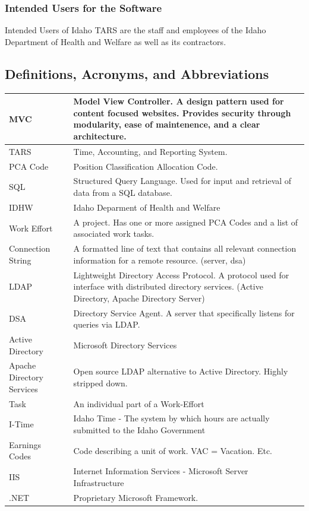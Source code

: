 \documentclass[letterpaper]{article}
\begin{document}
\subsubsection{Intended Users for the Software}
Intended Users of Idaho TARS are the staff and employees of the Idaho Department of Health and Welfare as well as its contractors.

\subsection{\bfseries{Definitions, Acronyms, and Abbreviations}}
\begin{center}
\begin{tabular}{| l | p{10cm} |}
\hline
MVC & Model View Controller. A design pattern used for content focused websites. Provides security through modularity, ease of maintenence, and a clear architecture.\\ \hline
TARS & Time, Accounting, and Reporting System. \\ \hline
PCA Code & Position Classification Allocation Code. \\ \hline
SQL & Structured Query Language. Used for input and retrieval of data from a SQL database.\\ \hline
IDHW & Idaho Deparment of Health and Welfare \\ \hline
Work Effort & A project. Has one or more assigned PCA Codes and a list of associated work tasks.\\ \hline
Connection String & A formatted line of text that contains all relevant connection information for a remote resource. (server, dsa) \\ \hline
LDAP & Lightweight Directory Access Protocol. A protocol used for interface with distributed directory services. (Active Directory, Apache Directory Server) \\ \hline  
DSA & Directory Service Agent. A server that specifically listens for queries via LDAP. \\ \hline
Active Directory & Microsoft Directory Services \\ \hline
Apache Directory Services & Open source LDAP alternative to Active Directory. Highly stripped down. \\ \hline
Task & An individual part of a Work-Effort \\ \hline
I-Time & Idaho Time - The system by which hours are actually submitted to the Idaho Government \\ \hline
Earnings Codes & Code describing a unit of work. VAC = Vacation. Etc.\\ \hline
IIS & Internet Information Services - Microsoft Server Infrastructure \\ \hline
.NET & Proprietary Microsoft Framework. \\ \hline
\end{tabular}
\end{center}
\end{document}
